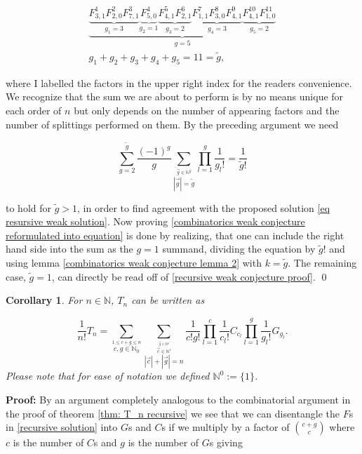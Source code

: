 \documentclass[b5paper,draft,openbib,12pt]{memoir}
\newtheorem{Corollary}[Def]{Corollary}
\begin{document}
\begin{align*}
\underbrace{\underbrace{F^1_{3,1} F^2_{2,0} F^3_{7,1}}_{g_1=3} \underbrace{F^4_{5,0}}_{g_2=1} \underbrace{F^5_{4,1} F^6_{2,1}}_{g_3=2} \underbrace{F^7_{1,1} F^8_{3,0} F^9_{4,1}}_{g_4=3} \underbrace{F^{10}_{4,1} F^{11}_{1,0}}_{g_5=2}}_{g=5}\\
 g_1+g_2+g_3+g_4+g_5=11=\tilde{g},
\end{align*}

where I labelled the factors in the upper right index for the readers convenience. We recognize
that the sum we are about to perform is by no means unique for each order of \(n\) but only 
depends on the number of appearing factors and the number of splittings performed on
them. By the preceding argument we need 

\begin{equation}\label{combinatorics weak conjecture reformulated into equation}
\sum_{g=2}^{\tilde{g}} \frac{(-1)^g}{g} \sum_{\stackrel{\vec{g}\in\mathbb{N}^g}{|\vec{g}|=\tilde{g}}} \prod_{l=1}^g \frac{1}{g_l!}
= \frac{1}{\tilde{g}!} 
\end{equation}


to hold for \(\tilde{g}>1\), in order to find agreement with the proposed solution \eqref{eq resursive weak solution}.
Now proving \eqref{combinatorics weak conjecture reformulated into equation} is done by 
realizing, that one can include the right hand side into the sum as the \(g=1\) summand, dividing
the equation by \(\tilde{g}!\) and using lemma \ref{combinatorics weak conjecture lemma 2}
with \(k=\tilde{g}\). The remaining case, \(\tilde{g}=1\), can directly be
read off of \eqref{recursive weak conjecture proof}. \qed

\begin{Corollary}\label{Corollary T_n by G's and C's}
For \(n\in\mathbb{N}\), \(T_n\) can be written as

\begin{equation}
\frac{1}{n!} T_n = \sum_{\stackrel{1\le c+g\le n}{c,g\in\mathbb{N}_0}} 
\sum_{\stackrel{\stackrel{\vec{g}\in\mathbb{N}^g}{\vec{c}\in\mathbb{N}^c}}{|\vec{c}| + |\vec{g}|=n}} 
\frac{1}{c! g!} \prod_{l=1}^c \frac{1}{c_l!} C_{c_l} \prod_{l=1}^g \frac{1}{g_l!} G_{g_l}.
\end{equation}
Please note that for ease of notation we defined \(\mathbb{N}^0:= \{1\}\).
\end{Corollary}
\textbf{Proof:} By an argument completely analogous to the combinatorial argument in the proof of theorem 
\eqref{thm: T_n recursive} we see that we can disentangle the \(F\)s in \eqref{recursive solution}
into \(G\)s and \(C\)s if we multiply by a factor of \(\binom{c+g}{c}\) where \(c\) is the 
number of \(C\)s and \(g\) is the number of \(G\)s giving
\end{document}
